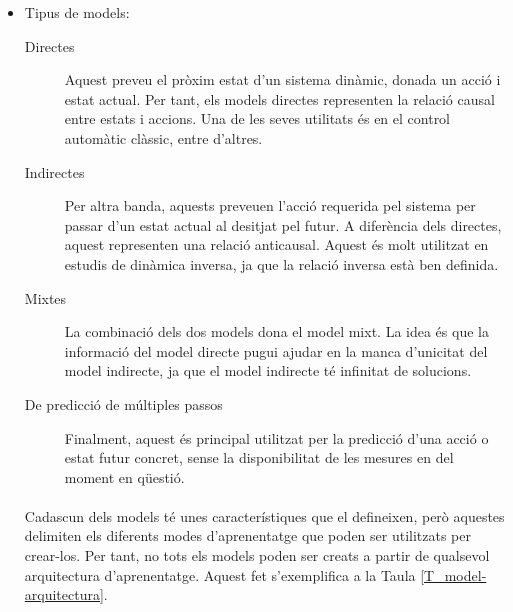\documentclass[12pt,a4paper,final,twoside]{article}
\begin{document}
\begin{itemize}
\item Tipus de models:

\begin{description}

\item[Directes] Aquest preveu el pròxim estat d'un sistema dinàmic, donada un acció i estat actual. Per tant, els models directes representen la relació causal entre estats i accions. Una de les seves utilitats és en el control automàtic clàssic, entre d'altres.

\item[Indirectes] Per altra banda, aquests preveuen l'acció requerida pel sistema per passar d'un estat actual al desitjat pel futur. A diferència dels directes, aquest representen una relació anticausal. Aquest és molt utilitzat en estudis de dinàmica inversa, ja que la relació inversa està ben definida.

\item[Mixtes] La combinació dels dos models dona el model mixt. La idea és que la informació del model directe pugui ajudar en la manca d'unicitat del model indirecte, ja que el model indirecte té infinitat de solucions. 

\item[De predicció de múltiples passos] Finalment, aquest és principal utilitzat per la predicció d'una acció o estat futur concret, sense la disponibilitat de les mesures en del moment en qüestió.

\end{description}

\paragraph{}Cadascun dels models té unes característiques que el defineixen, però aquestes delimiten els diferents modes d'aprenentatge que poden ser utilitzats per crear-los. Per tant, no tots els models poden ser creats a partir de qualsevol arquitectura d'aprenentatge. Aquest fet s'exemplifica a la Taula \ref{T_model-arquitectura}.
\end{itemize}
\end{document}
